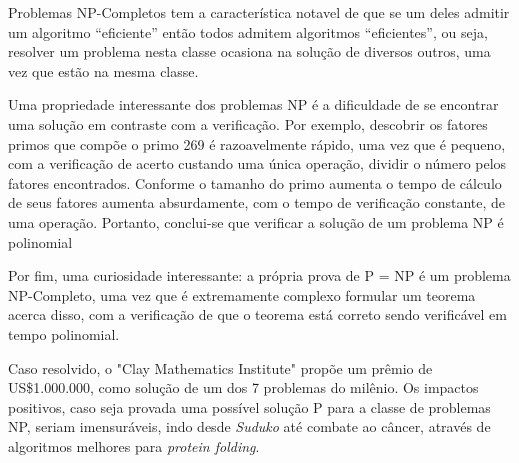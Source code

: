 \documentclass[14pt]{article}
\begin{document}
Problemas NP-Completos tem a característica notavel de que se um deles admitir um algoritmo “eficiente” então todos admitem algoritmos “eficientes”, ou seja, resolver um problema nesta classe ocasiona na solução de diversos outros, uma vez que estão na mesma classe. \cite{UFPR:Vignatti}

Uma propriedade interessante dos problemas NP é a dificuldade de se encontrar uma solução em contraste com a verificação. Por exemplo, descobrir os fatores primos que compõe o primo 269 é razoavelmente rápido, uma vez que é pequeno, com a verificação de acerto custando uma única operação, dividir o número pelos fatores encontrados. Conforme o tamanho do primo aumenta o tempo de cálculo de seus fatores aumenta absurdamente, com o tempo de verificação constante, de uma operação. Portanto, conclui-se que verificar a solução de um problema NP é polinomial \cite{kleinberg:2006}

Por fim, uma curiosidade interessante: a própria prova de P = NP é um problema NP-Completo, uma vez que é extremamente complexo formular um teorema acerca disso, com a verificação de que o teorema está correto sendo verificável em tempo polinomial.
  
Caso resolvido, o "Clay Mathematics Institute" propõe um prêmio de US\$1.000.000, como solução de um dos 7 problemas do milênio. Os impactos positivos, caso seja provada uma possível solução P para a classe de problemas NP, seriam imensuráveis, indo desde \textit{Suduko} até combate ao câncer, através de algoritmos melhores para \textit{protein folding}.








\end{document}

